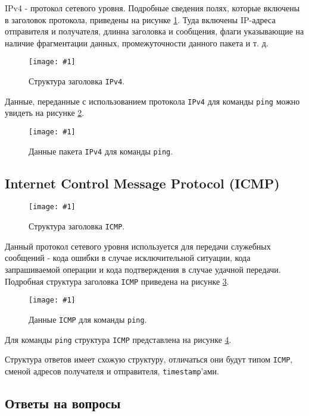 \documentclass[12pt, a4paper]{article}
\newcommand{\figc}[4]{
  \begin{figure}[H]
  \begin{center}
    \texttt{[image: \#1]}
    \caption{#2}
    \label{fig:#3}
  \end{center}
  \end{figure}
}
\begin{document}
IPv4 - протокол сетевого уровня. Подробные сведения полях, которые включены в заголовок
протокола, приведены на рисунке \ref{fig:ipv4_h}. Туда включены IP-адреса
отправителя и получателя, длинна заголовка и сообщения, флаги указывающие на
наличие фрагментации данных, промежуточности данного пакета и т. д.

\figc{ipv4_header}{Структура заголовка \texttt{IPv4}.}{ipv4_h}{1.4}

Данные, переданные с использованием протокола \texttt{IPv4} для команды
\texttt{ping} можно увидеть на рисунке \ref{fig:p_ip}.

\figc{ping_ipv4}{Данные пакета \texttt{IPv4} для команды \texttt{ping}.}{p_ip}{3.0}

\subsection{Internet Control Message Protocol (ICMP)}

\figc{icmp_header}{Структура заголовка \texttt{ICMP}.}{icmp_h}{1.4}

Данный протокол сетевого уровня используется для передачи служебных сообщений -
кода ошибки в случае исключительной ситуации, кода запрашиваемой операции и
кода подтверждения в случае удачной передачи. Подробная структура заголовка
\texttt{ICMP} приведена на рисунке \ref{fig:icmp_h}.

\figc{ping_icmp}{Данные \texttt{ICMP} для команды \texttt{ping}.}{ping_icmp}{3.0}

Для команды \texttt{ping} структура \texttt{ICMP} представлена на рисунке
\ref{fig:ping_icmp}.

Структура ответов имеет схожую структуру, отличаться они будут типом \texttt{ICMP},
сменой адресов получателя и отправителя, \texttt{timestamp}'ами.

\subsection{Ответы на вопросы}
\end{document}
